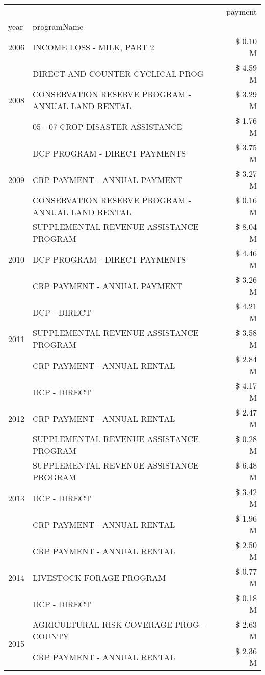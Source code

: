 \begin{tabular}{llr}
\toprule
 &  & payment \\
year & programName &  \\
\midrule
2006 & INCOME LOSS - MILK, PART 2 & \$ 0.10 M \\
\cline{1-3}
\multirow[t]{3}{*}{2008} & DIRECT AND COUNTER CYCLICAL PROG & \$ 4.59 M \\
 & CONSERVATION RESERVE PROGRAM - ANNUAL LAND RENTAL & \$ 3.29 M \\
 & 05 - 07 CROP DISASTER ASSISTANCE & \$ 1.76 M \\
\cline{1-3}
\multirow[t]{3}{*}{2009} & DCP PROGRAM - DIRECT PAYMENTS & \$ 3.75 M \\
 & CRP PAYMENT - ANNUAL PAYMENT & \$ 3.27 M \\
 & CONSERVATION RESERVE PROGRAM - ANNUAL LAND RENTAL & \$ 0.16 M \\
\cline{1-3}
\multirow[t]{3}{*}{2010} & SUPPLEMENTAL REVENUE ASSISTANCE PROGRAM & \$ 8.04 M \\
 & DCP PROGRAM - DIRECT PAYMENTS & \$ 4.46 M \\
 & CRP PAYMENT - ANNUAL PAYMENT & \$ 3.26 M \\
\cline{1-3}
\multirow[t]{3}{*}{2011} & DCP - DIRECT & \$ 4.21 M \\
 & SUPPLEMENTAL REVENUE ASSISTANCE PROGRAM & \$ 3.58 M \\
 & CRP PAYMENT - ANNUAL RENTAL & \$ 2.84 M \\
\cline{1-3}
\multirow[t]{3}{*}{2012} & DCP - DIRECT & \$ 4.17 M \\
 & CRP PAYMENT - ANNUAL RENTAL & \$ 2.47 M \\
 & SUPPLEMENTAL REVENUE ASSISTANCE PROGRAM & \$ 0.28 M \\
\cline{1-3}
\multirow[t]{3}{*}{2013} & SUPPLEMENTAL REVENUE ASSISTANCE PROGRAM & \$ 6.48 M \\
 & DCP - DIRECT & \$ 3.42 M \\
 & CRP PAYMENT - ANNUAL RENTAL & \$ 1.96 M \\
\cline{1-3}
\multirow[t]{3}{*}{2014} & CRP PAYMENT - ANNUAL RENTAL & \$ 2.50 M \\
 & LIVESTOCK FORAGE PROGRAM & \$ 0.77 M \\
 & DCP - DIRECT & \$ 0.18 M \\
\cline{1-3}
\multirow[t]{3}{*}{2015} & AGRICULTURAL RISK COVERAGE PROG - COUNTY & \$ 2.63 M \\
 & CRP PAYMENT - ANNUAL RENTAL & \$ 2.36 M \\

\end{tabular}
